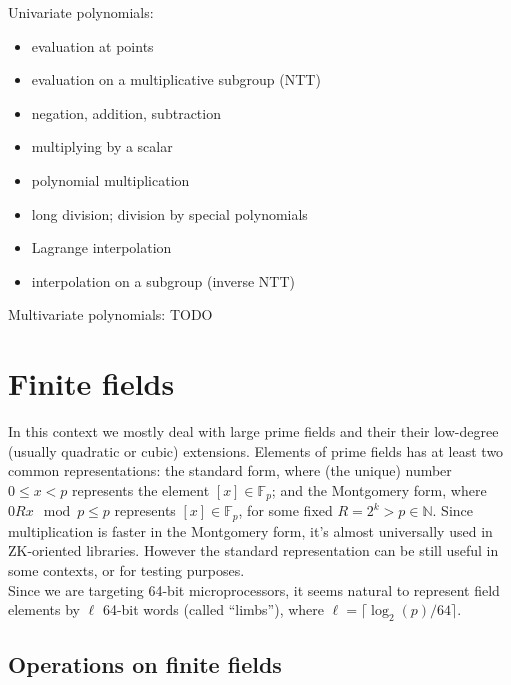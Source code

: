 \documentclass[12pt,draft,a4paper,openany,oneside]{amsbook}
\def\F{\mathbb{F}}
\def\N{\mathbb{N}}
\theoremstyle{plain}
\theoremstyle{definition}
\begin{document}
Univariate polynomials:
\begin{itemize}
\item evaluation at points
\item evaluation on a multiplicative subgroup (NTT)
\item negation, addition, subtraction
\item multiplying by a scalar 
\item polynomial multiplication
\item long division; division by special polynomials
\item Lagrange interpolation 
\item interpolation on a subgroup (inverse NTT) \\
\end{itemize}

Multivariate polynomials: TODO


\chapter{Finite fields}

In this context we mostly deal with large prime fields and their their low-degree
(usually quadratic or cubic) extensions. Elements of prime fields has at least two common
representations: the standard form, where (the unique) number $0\le x < p$ represents
the element $[x]\in \F_p$; and the Montgomery form, where $0Rx \mod p \le p$ represents
$[x]\in\F_p$, for some fixed $R=2^k>p\in\N$. Since multiplication is faster in the Montgomery
form, it's almost universally used in ZK-oriented libraries. However the standard
representation can be still useful in some contexts, or for testing purposes.\\

Since we are targeting 64-bit microprocessors, it seems natural to represent
field elements by $\ell$ 64-bit words (called ``limbs''), where $\ell=\lceil \log_2(p)/64 \rceil$.


\section{Operations on finite fields}
\end{document}
